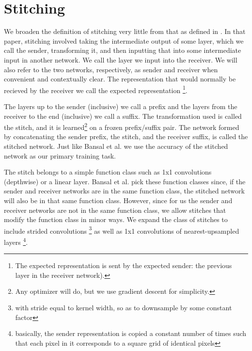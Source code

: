\documentclass{article} %
\begin{document}
\section{Stitching}
\label{Stitching}
We broaden the definition of stitching very little from that as defined in \cite{Bansal2021RevisitingMS}. In that paper,
stitching involved taking the intermediate output of some layer, which we call the sender, transforming it, and then
inputting that into some intermediate input in another network. We call the layer we input into the receiver. We
will also refer to the two networks, respectively, as sender and receiver when convenient and contextually clear.
The representation that would normally be recieved by the receiver we call the expected representation
\footnote{The expected representation is sent by
the expected sender: the previous layer in the receiver network).}.

The layers up to the sender (inclusive) we call a prefix and the layers from the receiver to the end (inclusive) we call
a suffix. The transformation used is called the stitch, and it is learned\footnote{Any optimizer will do, but we use gradient descent for simplicity.}
on a frozen prefix/suffix pair. The network formed by concatenating the sender prefix, the stitch, and the receiver
suffix, is called the stitched network. Just like Bansal et al. we use the accuracy of the stitched network as our
primary training task.

The stitch belongs to a simple function class such as 1x1 convolutions (depthwise) or
a linear layer. Bansal et al. pick these function classes since, if the sender and receiver networks are in the same
function class, the stitched network will also be in that same function class. However, since for us the sender and
receiver networks are not in the same function class, we allow stitches that modify the function class in minor ways.
We expand the class of stitches to include strided convolutions \footnote{with stride equal to kernel width, so as to downsample
by some constant factor} as well as 1x1 convolutions of nearest-upsampled layers \footnote{basically, the sender representation
is copied a constant number of times such that each pixel in it corresponds to a square grid of identical pixels}.
\end{document}
